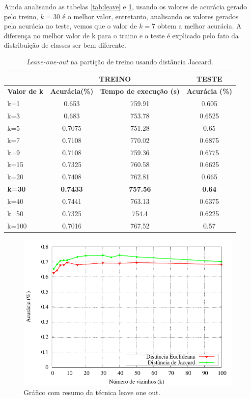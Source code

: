 \documentclass[a4paper, 11 pt, onecolumn]{article}   %
\begin{document}
Ainda analisando as tabelas \ref{tab:leave} e \ref{tab:leave_jaccard}, usando os valores de acurácia gerado pelo treino, $k=30$ é o melhor valor, entretanto, analisando os valores gerados pela acurácia no teste, vemos que o valor de $k=7$ obtem a melhor acurácia. A diferença no melhor valor de k para o traino e o teste é explicado pelo fato da distribuição de classes ser bem diferente.

\begin{table}[htp!]
\centering
 \begin{tabular}{l|c c | c}
  \textbf{}& \multicolumn{2}{|c|}{\textbf{TREINO}} & \textbf{TESTE}\\ \hline
  \textbf{Valor de k} &\textbf{Acurácia(\%)}&\textbf{Tempo de execução (s)} & \textbf{Acurácia (\%)}\\ \hline
    k=1 & 0.653  & 759.91 & 0.605\\
    k=3 & 0.683   & 753.78 & 0.6525\\
    k=5 & 0.7075  & 751.28 & 0.65\\
    k=7 & 0.7108  & 770.02 & 0.6875\\
    k=9 & 0.7108  & 759.36 &0.6775 \\
    k=15 & 0.7325   & 760.58 & 0.6625 \\
    k=20 & 0.7408  & 762.81 & 0.665 \\
    \textbf{k=30 }& \textbf{0.7433}  & \textbf{757.56} & \textbf{0.64}\\
    k=40 & 0.7441  & 763.13 & 0.6375\\
    k=50 & 0.7325  & 754.4 &0.6225\\
    k=100 & 0.7016   & 767.52 & 0.57\\
 \end{tabular}
  \caption{\label{tab:leave_jaccard} \textit{Leave-one-out} na partição de treino usando distância Jaccard.}
\end{table}

\begin{figure}
 \includegraphics{imagens/leave_out.pdf}
 \caption{\label{fig:leave} Gráfico com resumo da técnica leave one out.}
\end{figure}
\end{document}

